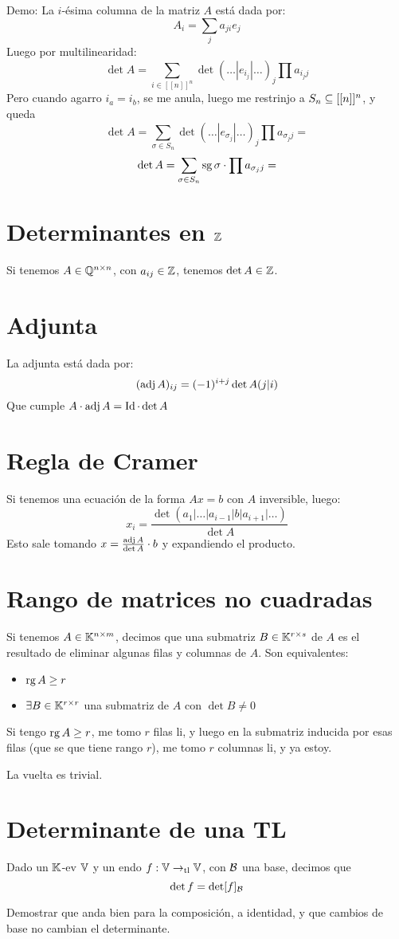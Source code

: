 \documentclass{article}
\begin{document}
Demo:
La $i$-ésima columna de la matriz $A$ está dada por:
\[A_i = \sum_j a_{ji} e_j\]
Luego por multilinearidad:
\[
	\det A = \sum_{i \in [[n]]^n} \det (\dots | e_{i_j} | \dots)_j \prod a_{i_jj}
\]
Pero cuando agarro $i_{a} = i_{b}$, se me anula, luego me restrinjo a $S_n \subseteq [[n]]^n$, y queda
\[
	\det A = \sum_{\sigma \in S_n} \det (\dots | e_{\sigma_j} | \dots)_j \prod a_{\sigma_jj} =
\]
\[
	\det A = \sum_{\sigma \in S_n} \operatorname{sg} \sigma \cdot \prod a_{\sigma_jj} =
\]

\section*{Determinantes en $\mathbb{Z}$}
Si tenemos $A \in \mathbb{Q}^{n \times n}$, con $a_{ij} \in \mathbb{Z}$, tenemos $\det A \in \mathbb{Z}$.

\section*{Adjunta}
La adjunta está dada por:
\[
	(\operatorname{adj} A)_{ij} = (-1)^{i+j} \det A(j|i)
\]
Que cumple $A \cdot \operatorname{adj} A = \operatorname{Id} \cdot \det A$
\section*{Regla de Cramer}
Si tenemos una ecuación de la forma $Ax = b$ con $A$ inversible, luego:
\[
	x_i = \frac{\det (a_1 | \dots | a_{i-1} | b | a_{i+1} | \dots )}{\det A}
\]
Esto sale tomando $x = \frac{\operatorname{adj} A}{\det A} \cdot b$ y expandiendo el producto.

\section*{Rango de matrices no cuadradas}
Si tenemos $A \in \mathbb{K}^{n \times m}$, decimos que una submatriz $B \in \mathbb{K}^{r \times s}$ de $A$ es el resultado de eliminar algunas filas y columnas de $A$.
Son equivalentes:
\begin{itemize}
	\item $\operatorname{rg} A \geq r$
	\item $\exists B \in \mathbb{K}^{r \times r}$ una submatriz de $A$ con $\det B \neq 0$
\end{itemize}
Si tengo $\operatorname{rg} A \geq r$, me tomo $r$ filas li, y luego en la submatriz inducida por esas filas (que se que tiene rango $r$), me tomo $r$ columnas li, y ya estoy.

La vuelta es trivial.

\section*{Determinante de una TL}
Dado un $\mathbb{K}$-ev $\mathbb{V}$ y un endo $f : \mathbb{V} \to_{\operatorname{tl}} \mathbb{V}$, con $\mathcal{B}$ una base, decimos que \[\det f = \det [f]_{\mathcal{B}}\]

Demostrar que anda bien para la composición, a identidad, y que cambios de base no cambian el determinante.
\end{document}
